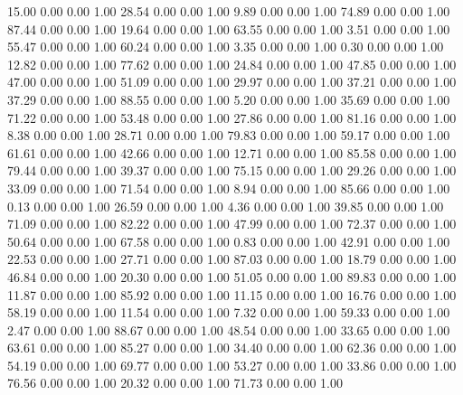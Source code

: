    15.00   0.00   0.00   1.00
   28.54   0.00   0.00   1.00
    9.89   0.00   0.00   1.00
   74.89   0.00   0.00   1.00
   87.44   0.00   0.00   1.00
   19.64   0.00   0.00   1.00
   63.55   0.00   0.00   1.00
    3.51   0.00   0.00   1.00
   55.47   0.00   0.00   1.00
   60.24   0.00   0.00   1.00
    3.35   0.00   0.00   1.00
    0.30   0.00   0.00   1.00
   12.82   0.00   0.00   1.00
   77.62   0.00   0.00   1.00
   24.84   0.00   0.00   1.00
   47.85   0.00   0.00   1.00
   47.00   0.00   0.00   1.00
   51.09   0.00   0.00   1.00
   29.97   0.00   0.00   1.00
   37.21   0.00   0.00   1.00
   37.29   0.00   0.00   1.00
   88.55   0.00   0.00   1.00
    5.20   0.00   0.00   1.00
   35.69   0.00   0.00   1.00
   71.22   0.00   0.00   1.00
   53.48   0.00   0.00   1.00
   27.86   0.00   0.00   1.00
   81.16   0.00   0.00   1.00
    8.38   0.00   0.00   1.00
   28.71   0.00   0.00   1.00
   79.83   0.00   0.00   1.00
   59.17   0.00   0.00   1.00
   61.61   0.00   0.00   1.00
   42.66   0.00   0.00   1.00
   12.71   0.00   0.00   1.00
   85.58   0.00   0.00   1.00
   79.44   0.00   0.00   1.00
   39.37   0.00   0.00   1.00
   75.15   0.00   0.00   1.00
   29.26   0.00   0.00   1.00
   33.09   0.00   0.00   1.00
   71.54   0.00   0.00   1.00
    8.94   0.00   0.00   1.00
   85.66   0.00   0.00   1.00
    0.13   0.00   0.00   1.00
   26.59   0.00   0.00   1.00
    4.36   0.00   0.00   1.00
   39.85   0.00   0.00   1.00
   71.09   0.00   0.00   1.00
   82.22   0.00   0.00   1.00
   47.99   0.00   0.00   1.00
   72.37   0.00   0.00   1.00
   50.64   0.00   0.00   1.00
   67.58   0.00   0.00   1.00
    0.83   0.00   0.00   1.00
   42.91   0.00   0.00   1.00
   22.53   0.00   0.00   1.00
   27.71   0.00   0.00   1.00
   87.03   0.00   0.00   1.00
   18.79   0.00   0.00   1.00
   46.84   0.00   0.00   1.00
   20.30   0.00   0.00   1.00
   51.05   0.00   0.00   1.00
   89.83   0.00   0.00   1.00
   11.87   0.00   0.00   1.00
   85.92   0.00   0.00   1.00
   11.15   0.00   0.00   1.00
   16.76   0.00   0.00   1.00
   58.19   0.00   0.00   1.00
   11.54   0.00   0.00   1.00
    7.32   0.00   0.00   1.00
   59.33   0.00   0.00   1.00
    2.47   0.00   0.00   1.00
   88.67   0.00   0.00   1.00
   48.54   0.00   0.00   1.00
   33.65   0.00   0.00   1.00
   63.61   0.00   0.00   1.00
   85.27   0.00   0.00   1.00
   34.40   0.00   0.00   1.00
   62.36   0.00   0.00   1.00
   54.19   0.00   0.00   1.00
   69.77   0.00   0.00   1.00
   53.27   0.00   0.00   1.00
   33.86   0.00   0.00   1.00
   76.56   0.00   0.00   1.00
   20.32   0.00   0.00   1.00
   71.73   0.00   0.00   1.00
